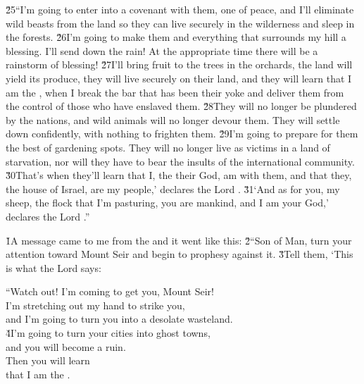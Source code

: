 \v{25}``I'm going to enter into a covenant with them, one of peace, and I'll eliminate wild beasts from the land so they can live securely in the wilderness and sleep in the forests. \v{26}I'm going to make them and everything that surrounds my hill a blessing. I'll send down the rain! At the appropriate time there will be a rainstorm of blessing! \v{27}I'll bring fruit to the trees in the orchards, the land will yield its produce, they will live securely on their land, and they will learn that I am the , when I break the bar that has been their yoke and deliver them from the control of those who have enslaved them. \v{28}They will no longer be plundered by the nations, and wild animals will no longer devour them. They will settle down confidently, with nothing to frighten them. \v{29}I'm going to prepare for them the best of gardening spots. They will no longer live as victims in a land of starvation, nor will they have to bear the insults of the international community. \v{30}That's when they'll learn that I, the  their God, am with them, and that they, the house of Israel, are my people,' declares the Lord . \v{31}`And as for you, my sheep, the flock that I'm pasturing, you are mankind, and I am your God,' declares the Lord .''

\v{1}A message came to me from the  and it went like this: \v{2}``Son of Man, turn your attention toward Mount Seir and begin to prophesy against it. \v{3}Tell them, `This is what the Lord  says:

\begin{poetry}
\poeml ``Watch out! I'm coming to get you, Mount Seir! \\
\poemll    I'm stretching out my hand to strike you, \\
\poemlll       and I'm going to turn you into a desolate wasteland. \\
\poeml \v{4}I'm going to turn your cities into ghost towns, \\
\poemll    and you will become a ruin. \\
\poeml Then you will learn \\
\poemll    that I am the .
\end{poetry}

